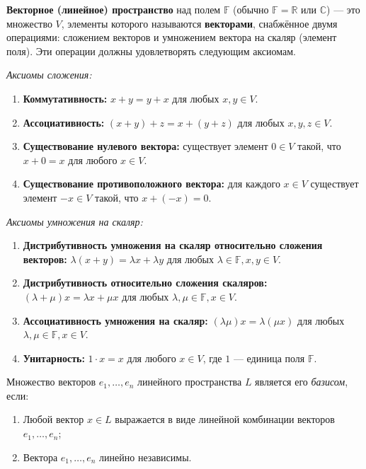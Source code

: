 \begin{definition}
    \textbf{Векторное (линейное) пространство} над полем $\mathbb{F}$ (обычно $\mathbb{F} = \mathbb{R}$ или $\mathbb{C}$) — это множество $V$, элементы которого называются \textbf{векторами}, снабжённое двумя операциями: сложением векторов и умножением вектора на скаляр (элемент поля). Эти операции должны удовлетворять следующим аксиомам.

\textit{Аксиомы сложения:}

\begin{enumerate}
    \item \textbf{Коммутативность:} $x + y = y + x$ для любых $x, y \in V$.
    \item \textbf{Ассоциативность:} $(x + y) + z = x + (y + z)$ для любых $x, y, z \in V$.
    \item \textbf{Существование нулевого вектора:} существует элемент $0 \in V$ такой, что $x + 0 = x$ для любого $x \in V$.
    \item \textbf{Существование противоположного вектора:} для каждого $x \in V$ существует элемент $-x \in V$ такой, что $x + (-x) = 0$.
\end{enumerate}

\textit{Аксиомы умножения на скаляр:}

\begin{enumerate}
    \item \textbf{Дистрибутивность умножения на скаляр относительно сложения векторов:} $\lambda(x + y) = \lambda x + \lambda y$ для любых $\lambda \in \mathbb{F}, x, y \in V$.
    \item \textbf{Дистрибутивность относительно сложения скаляров:} $(\lambda + \mu)x = \lambda x + \mu x$ для любых $\lambda, \mu \in \mathbb{F}, x \in V$.
    \item \textbf{Ассоциативность умножения на скаляр:} $(\lambda\mu)x = \lambda(\mu x)$ для любых $\lambda, \mu \in \mathbb{F}, x \in V$.
    \item \textbf{Унитарность:} $1 \cdot x = x$ для любого $x \in V$, где $1$ — единица поля $\mathbb{F}$.
\end{enumerate}
\end{definition}

\begin{definition}
    Множество векторов $e_1, \dots, e_n$ линейного пространства $L$ является его \textit{базисом}, если:
\begin{enumerate}
    \item[1)] Любой вектор $x \in L$ выражается в виде линейной комбинации векторов $e_1, \dots, e_n$;
    \item[2)] Вектора $e_1, \dots, e_n$ линейно независимы.
\end{enumerate}
\end{definition}

